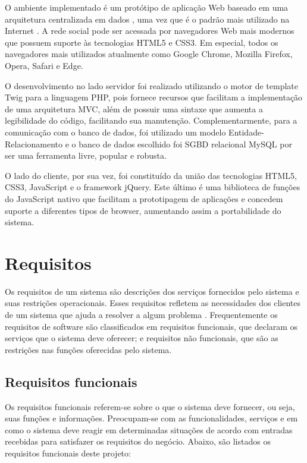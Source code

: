 \documentclass[cic,tc]{iiufrgs}
\begin{document}
O ambiente implementado é um protótipo de aplicação Web baseado em uma arquitetura centralizada em dados \cite{pressman}, uma vez que é o padrão mais utilizado na Internet \cite{kurose}. A rede social pode ser acessada por navegadores Web mais modernos que possuem suporte às tecnologias HTML5 e CSS3. Em especial, todos os navegadores mais utilizados atualmente como Google Chrome, Mozilla Firefox, Opera, Safari e Edge.

O desenvolvimento no lado servidor foi realizado utilizando o motor de template Twig para a linguagem PHP, pois fornece recursos que facilitam a implementação de uma arquitetura MVC, além de possuir uma sintaxe que aumenta a legibilidade do código, facilitando sua manutenção. Complementarmente, para a comunicação com o banco de dados, foi utilizado um modelo Entidade-Relacionamento e o banco de dados escolhido foi SGBD relacional MySQL por ser uma ferramenta livre, popular e robusta\cite{mysql}.

O lado do cliente, por sua vez, foi constituído da união das tecnologias HTML5, CSS3, JavaScript e o framework jQuery. Este último é uma biblioteca de funções do JavaScript nativo que facilitam a prototipagem de aplicações e concedem suporte a diferentes tipos de browser, aumentando assim a portabilidade do sistema.


\section{Requisitos}
\label{metodologiaRequisitos}
Os requisitos de um sistema são descrições dos serviços fornecidos pelo sistema e suas restrições operacionais. Esses requisitos refletem as necessidades dos clientes de um sistema que ajuda a resolver a algum problema \cite{sommerville}. Frequentemente os requisitos de software são classificados em requisitos funcionais, que declaram os serviços que o sistema deve oferecer; e requisitos não funcionais, que são as restrições nas funções oferecidas pelo sistema. 

\subsection{Requisitos funcionais}
\label{requisitosRF}
Os requisitos funcionais referem-se sobre o que o sistema deve fornecer, ou seja, suas funções e informações. Preocupam-se com as funcionalidades, serviços e em como o sistema deve reagir em determinadas situações de acordo com entradas recebidas para satisfazer os requisitos do negócio. Abaixo, são listados os requisitos funcionais deste projeto:  
\end{document}

